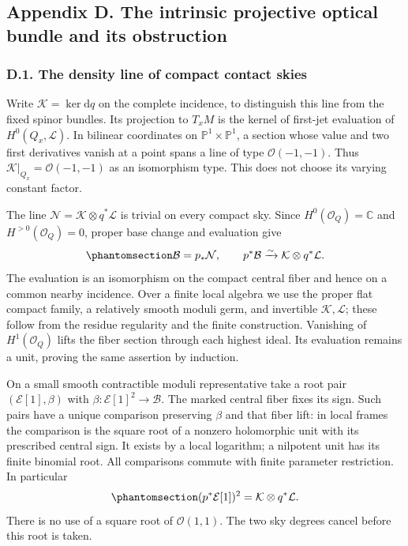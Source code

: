 \documentclass[
  english,
  11pt,
  reqno]{amsart}
\begin{document}
\subsection{Appendix D. The intrinsic projective optical bundle and its
obstruction}\label{appendix-d.-the-intrinsic-projective-optical-bundle-and-its-obstruction}

\protect{}\label{sec:gg-optical-density-line}

\subsubsection{D.1. The density line of compact contact
skies}\label{d.1.-the-density-line-of-compact-contact-skies}

Write \(\mathcal K=\ker\mathrm dq\) on the complete incidence, to
distinguish this line from the fixed spinor bundles. Its projection to
\(T_xM\) is the kernel of first-jet evaluation of
\(H^0(Q_x,\mathcal L)\). In bilinear coordinates on
\(\mathbb P^1\times\mathbb P^1\), a section whose value and two first
derivatives vanish at a point spans a line of type
\(\mathcal O(-1,-1)\). Thus \(\mathcal K|_{Q_x}=\mathcal O(-1,-1)\) as
an isomorphism type. This does not choose its varying constant factor.

The line \(\mathcal N=\mathcal K\otimes q^*\mathcal L\) is trivial on
every compact sky. Since \(H^0(\mathcal O_Q)=\mathbb C\) and
\(H^{>0}(\mathcal O_Q)=0\), proper base change and evaluation give
\begin{equation}\protect\phantomsection\label{eq:gg-intrinsic-density-line}{
 \mathcal B=p_*\mathcal N,\qquad
 p^*\mathcal B\xrightarrow{\sim}
               \mathcal K\otimes q^*\mathcal L .
}\end{equation} The evaluation is an isomorphism on the compact central
fiber and hence on a common nearby incidence. Over a finite local
algebra we use the proper flat compact family, a relatively smooth
moduli germ, and invertible \(\mathcal K,\mathcal L\); these follow from
the residue regularity and the finite construction. Vanishing of
\(H^1(\mathcal O_Q)\) lifts the fiber section through each highest
ideal. Its evaluation remains a unit, proving the same assertion by
induction.

On a small smooth contractible moduli representative take a root pair
\((\mathcal E[1],\beta)\) with \(\beta:\mathcal E[1]^2\to\mathcal B\).
The marked central fiber fixes its sign. Such pairs have a unique
comparison preserving \(\beta\) and that fiber lift: in local frames the
comparison is the square root of a nonzero holomorphic unit with its
prescribed central sign. It exists by a local logarithm; a nilpotent
unit has its finite binomial root. All comparisons commute with finite
parameter restriction. In particular
\begin{equation}\protect\phantomsection\label{eq:gg-intrinsic-root-line}{
 (p^*\mathcal E[1])^2
             =\mathcal K\otimes q^*\mathcal L .
}\end{equation} There is no use of a square root of \(\mathcal O(1,1)\).
The two sky degrees cancel before this root is taken.
\end{document}
